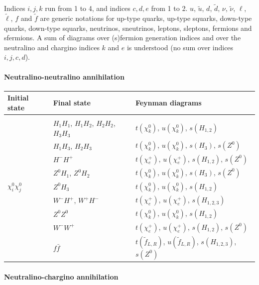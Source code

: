 \documentclass[a4paper,10pt,oneside]{book}
\newcommand{\tabspace}{\\[-2.5ex]}
\begin{document}
Indices $i,j,k$ run
from 1 to 4, and indices $c,d,e$ from 1 to 2.  $u$, $\tilde{u}$,
$d$, $\tilde{d}$, $\nu$, $\tilde{\nu}$, $\ell$, $\tilde{\ell}$,
$f$ and $\tilde{f}$ are generic notations for up-type quarks,
up-type squarks, down-type quarks, down-type squarks, neutrinos,
sneutrinos, leptons, sleptons, fermions and sfermions.  A sum of
diagrams over (s)fermion generation indices and over the
neutralino and chargino indices $k$ and $e$ is understood (no sum
over indices $i,j,c,d$).

\paragraph{Neutralino-neutralino annihilation}

\begin{center}  
\begin{tabular}{lll} \hline 
  Initial state & Final state & Feynman diagrams \\ \hline \tabspace
   & $H_1 H_1$, $H_1 H_2$, $H_2 H_2$, $H_3 H_3$ &
  $t(\chi_k^0)$, $u(\chi_k^0)$, $s(H_{1,2})$ \\
   & $H_1 H_3$, $H_2 H_3$ &
  $t(\chi_k^0)$, $u(\chi_k^0)$, $s(H_{3})$, $s(Z^0)$ \\
   & $H^- H^+$ &
  $t(\chi_e^+)$, $u(\chi_e^+)$, $s(H_{1,2})$, $s(Z^0)$ \\
   & $Z^0 H_1$, $Z^0 H_2$ &
  $t(\chi_k^0)$, $u(\chi_k^0)$, $s(H_{3})$, $s(Z^0)$ \\
  $\chi_i^0 \chi_j^0$ & $Z^0 H_3$ &
  $t(\chi_k^0)$, $u(\chi_k^0)$, $s(H_{1,2})$ \\
   & $W^- H^+$, $W^+ H^-$ &
  $t(\chi_e^+)$, $u(\chi_e^+)$, $s(H_{1,2,3})$ \\
   & $Z^0 Z^0$ &
  $t(\chi_k^0)$, $u(\chi_k^0)$, $s(H_{1,2})$ \\
   & $W^- W^+$ &
  $t(\chi_e^+)$, $u(\chi_e^+)$, $s(H_{1,2})$, $s(Z^0)$ \\
   & $f \bar{f}$ &
  $t(\tilde{f}_{L,R})$, $u(\tilde{f}_{L,R})$, $s(H_{1,2,3})$,
  $s(Z^0)$ \\ \hline  
\end{tabular}
\end{center}


\paragraph{Neutralino-chargino annihilation}
\end{document}
